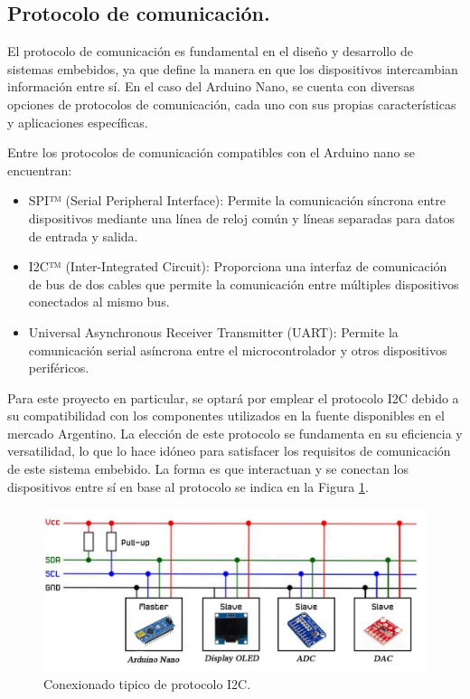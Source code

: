 \subsection{Protocolo de comunicación.}
El protocolo de comunicación es fundamental en el diseño y desarrollo de sistemas embebidos, ya que define la manera en que los dispositivos intercambian información entre sí. En el caso del Arduino Nano, se cuenta con diversas opciones de protocolos de comunicación, cada uno con sus propias características y aplicaciones específicas. \par 
Entre los protocolos de comunicación compatibles con el Arduino nano se encuentran:
\begin{itemize}
    \item SPI™ (Serial Peripheral Interface): Permite la comunicación síncrona entre dispositivos mediante una línea de reloj común y líneas separadas para datos de entrada y salida.
    \item I2C™ (Inter-Integrated Circuit): Proporciona una interfaz de comunicación de bus de dos cables que permite la comunicación entre múltiples dispositivos conectados al mismo bus.
    \item Universal Asynchronous Receiver Transmitter (UART): Permite la comunicación serial asíncrona entre el microcontrolador y otros dispositivos periféricos.
\end{itemize}\par 
Para este proyecto en particular, se optará por emplear el protocolo I2C debido a su compatibilidad con los componentes utilizados en la fuente disponibles en el mercado Argentino. La elección de este protocolo se fundamenta en su eficiencia y versatilidad, lo que lo hace idóneo para satisfacer los requisitos de comunicación de este sistema embebido.
La forma es que interactuan y se conectan los dispositivos entre sí en base al protocolo se indica en la Figura \ref{F:diagrama_protocolo_i2c}.

\begin{figure}[H]
    \centering
    \includegraphics[scale=0.3]{./imagenes/i2cprotocol.jpg}
    \caption{Conexionado tipico de protocolo I2C.}
    \label{F:diagrama_protocolo_i2c}
\end{figure}

